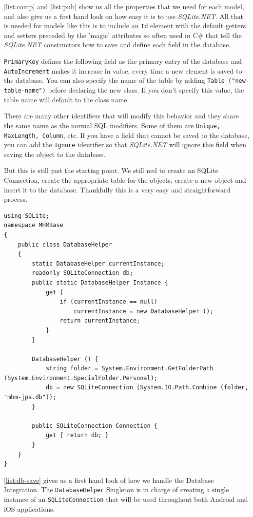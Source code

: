 \autoref{list:comp} and \autoref{list:pub} show us all the properties that we need for each model, and also give us a first hand look on how easy it is to use \textit{SQLite.NET}. All that is needed for models like this is to include an \texttt{Id} element with the default getters and setters preceded by the 'magic' attributes so often used in C\# that tell the \textit{SQLite.NET} constructors how to save and define each field in the database. 

\texttt{PrimaryKey} defines the following field as the primary entry of the database and \texttt{AutoIncrement} makes it increase in value, every time a new element is saved to the database. You can also specify the name of the table by adding \texttt{Table ("new-table-name")} before declaring the new class. If you don't specify this value, the table name will default to the class name.

There are many other identifiers that will modify this behavior and they share the same name as the normal SQL modifiers. Some of them are \texttt{Unique, MaxLength, Column}, etc. If you have a field that cannot be saved to the database, you can add the \texttt{Ignore} identifier so that \textit{SQLite.NET} will ignore this field when saving the object to the database.

But this is still just the starting point. We still ned to create an SQLite Connection, create the appropriate table for the objects, create a new object and insert it to the database. Thankfully this is a very easy and straightforward process.

\begin{lstlisting}[frame=lt,caption=DatabaseHelper.cs, label={list:db-save}]
using SQLite;
namespace MHMBase
{
	public class DatabaseHelper
	{
		static DatabaseHelper currentInstance;
		readonly SQLiteConnection db;
		public static DatabaseHelper Instance {
			get {
				if (currentInstance == null)
					currentInstance = new DatabaseHelper ();
				return currentInstance;			
			}
		}

		DatabaseHelper () {
			string folder = System.Environment.GetFolderPath (System.Environment.SpecialFolder.Personal);
			db = new SQLiteConnection (System.IO.Path.Combine (folder, "mhm-jpa.db"));		
		}

		public SQLiteConnection Connection {
			get { return db; }		
		}
	}
}
\end{lstlisting}

\autoref{list:db-save} gives us a first hand look of how we handle the Database Integration. The \texttt{DatabaseHelper} Singleton  is in charge of creating a single instance of an \texttt{SQLiteConnection} that will be used throughout both Android and iOS applications.

